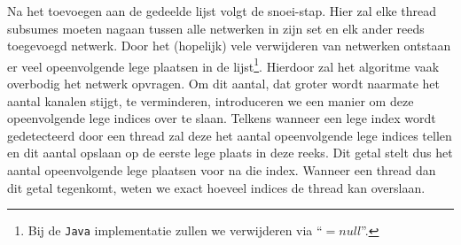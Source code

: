 \documentclass{article}
\begin{document}
Na het toevoegen aan de gedeelde lijst volgt de snoei-stap. Hier zal elke thread subsumes moeten nagaan tussen alle netwerken in zijn set en elk ander reeds toegevoegd netwerk.
Door het (hopelijk) vele verwijderen van netwerken ontstaan er veel opeenvolgende lege plaatsen in de lijst\footnote{Bij de \texttt{Java} implementatie zullen we verwijderen via  ``${= null}$''.}.
Hierdoor zal het algoritme vaak overbodig het netwerk opvragen.
Om dit aantal, dat groter wordt naarmate het aantal kanalen stijgt, te verminderen, introduceren we een manier om deze opeenvolgende lege indices over te slaan. 
Telkens wanneer een lege index wordt gedetecteerd door een thread zal deze het aantal opeenvolgende lege indices tellen en dit aantal opslaan op de eerste lege plaats in deze reeks.
Dit getal stelt dus het aantal opeenvolgende lege plaatsen voor na die index.
Wanneer een thread dan dit getal tegenkomt, weten we exact hoeveel indices de thread kan overslaan.
\end{document}
